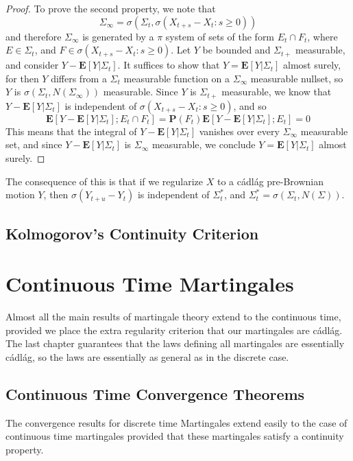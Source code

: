 \begin{proof}
    To prove the second property, we note that
    \[ \Sigma_\infty = \sigma(\Sigma_t, \sigma(X_{t+s} - X_t: s \geq 0)) \]
    and therefore $\Sigma_\infty$ is generated by a $\pi$ system of sets of the form $E_t \cap F_t$, where $E \in \Sigma_t$, and $F \in \sigma(X_{t+s} - X_t: s \geq 0)$. Let $Y$ be bounded and $\Sigma_{t+}$ measurable, and consider $Y - \mathbf{E}[Y|\Sigma_t]$. It suffices to show that $Y = \mathbf{E}[Y|\Sigma_t]$ almost surely, for then $Y$ differs from a $\Sigma_t$ measurable function on a $\Sigma_\infty$ measurable nullset, so $Y$ is $\sigma(\Sigma_t, N(\Sigma_\infty))$ measurable. Since $Y$ is $\Sigma_{t+}$ measurable, we know that $Y - \mathbf{E}[Y|\Sigma_t]$ is independent of $\sigma(X_{t+s} - X_t: s \geq 0)$, and so
    \[ \mathbf{E}[Y - \mathbf{E}[Y|\Sigma_t];E_t \cap F_t] = \mathbf{P}(F_t) \mathbf{E}[Y - \mathbf{E}[Y|\Sigma_t];E_t] = 0 \]
    This means that the integral of $Y - \mathbf{E}[Y|\Sigma_t]$ vanishes over every $\Sigma_\infty$ measurable set, and since $Y - \mathbf{E}[Y|\Sigma_t]$ is $\Sigma_\infty$ measurable, we conclude $Y = \mathbf{E}[Y|\Sigma_t]$ almost surely.
\end{proof}

The consequence of this is that if we regularize $X$ to a c\'{a}dl\'{a}g pre-Brownian motion $Y$, then $\sigma(Y_{t+u} - Y_t)$ is independent of $\Sigma^*_t$, and $\Sigma^*_t = \sigma(\Sigma_t, N(\Sigma))$.

\section{Kolmogorov's Continuity Criterion}

\chapter{Continuous Time Martingales}

Almost all the main results of martingale theory extend to the continuous time, provided we place the extra regularity criterion that our martingales are c\'{a}dl\'{a}g. The last chapter guarantees that the laws defining all martingales are essentially c\'{a}dl\'{a}g, so the laws are essentially as general as in the discrete case.

\section{Continuous Time Convergence Theorems}

The convergence results for discrete time Martingales extend easily to the case of continuous time martingales provided that these martingales satisfy a continuity property.

